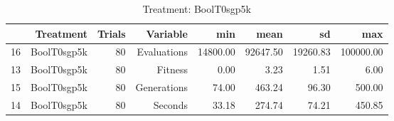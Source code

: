\begin{table}[ht]
\centering
\begin{tabular}{rrrrrrrr}
  \hline
 & Treatment & Trials & Variable & min & mean & sd & max \\ 
  \hline
16 & BoolT0sgp5k &  80 & Evaluations & 14800.00 & 92647.50 & 19260.83 & 100000.00 \\ 
  13 & BoolT0sgp5k &  80 & Fitness & 0.00 & 3.23 & 1.51 & 6.00 \\ 
  15 & BoolT0sgp5k &  80 & Generations & 74.00 & 463.24 & 96.30 & 500.00 \\ 
  14 & BoolT0sgp5k &  80 & Seconds & 33.18 & 274.74 & 74.21 & 450.85 \\ 
   \hline
\end{tabular}
\caption{Treatment: BoolT0sgp5k} 
\end{table}
